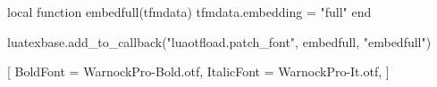%
%
\usepackage[a-3u]{pdfx}

\usepackage[highstructure]{accessibility}

\usepackage{luacode}
\begin{luacode}
    local function embedfull(tfmdata)
    tfmdata.embedding = "full"
    end
    
    luatexbase.add_to_callback("luaotfload.patch_font", embedfull, "embedfull")
\end{luacode}

%
%
\flushbottom

\usepackage[T1]{fontenc}
\usepackage{lmodern}
\usepackage[ngerman]{babel}
\usepackage{microtype}
\usepackage[german=quotes]{csquotes}

%
%
\usepackage{soulutf8}

%
%
\usepackage{hyperref}

\usepackage{%
    microtype,%
    ellipsis,%
    mparhack,
    parskip
}

%
%
\setcounter{tocdepth}{0}

%

\renewcommand*\chapterformat{}
\renewcommand*\sectionformat{}
\newcommand*\gobbleentrynumber[1]{}

\usepackage{multicol}
\setlength{\columnsep}{5mm}

\usepackage{caption}
\captionsetup[table]{
    labelformat=empty,
}

%
%
\usepackage{fontspec}
\setmainfont{WarnockPro-Regular.otf}
[
BoldFont = WarnockPro-Bold.otf,
ItalicFont = WarnockPro-It.otf,
]

